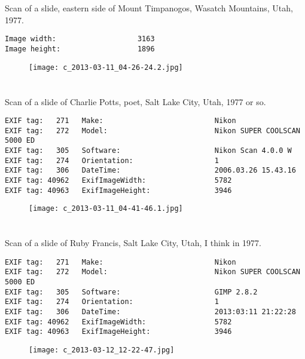 \clearpage
\section{\protect{}}
\noindent Scan of a slide, eastern side of Mount Timpanogos, Wasatch Mountains, Utah, 1977.
\noindent
\begin{lstlisting}
Image width:                   3163
Image height:                  1896

\end{lstlisting}
\clearpage
\begin{figure}
\raggedleft
\texttt{[image: c\_2013-03-11\_04-26-24.2.jpg]}
\end{figure}


\clearpage
\section{\protect{}}
\noindent Scan of a slide of Charlie Potts, poet, Salt Lake City, Utah, 1977 or so.
\noindent
\begin{lstlisting}
EXIF tag:   271   Make:                          Nikon
EXIF tag:   272   Model:                         Nikon SUPER COOLSCAN 5000 ED
EXIF tag:   305   Software:                      Nikon Scan 4.0.0 W
EXIF tag:   274   Orientation:                   1
EXIF tag:   306   DateTime:                      2006.03.26 15.43.16
EXIF tag: 40962   ExifImageWidth:                5782
EXIF tag: 40963   ExifImageHeight:               3946

\end{lstlisting}
\clearpage
\begin{figure}
\raggedleft
\texttt{[image: c\_2013-03-11\_04-41-46.1.jpg]}
\end{figure}


\clearpage
\section{\protect{}}
\noindent Scan of a slide of Ruby Francis, Salt Lake City, Utah, I think in 1977.
\noindent
\begin{lstlisting}
EXIF tag:   271   Make:                          Nikon
EXIF tag:   272   Model:                         Nikon SUPER COOLSCAN 5000 ED
EXIF tag:   305   Software:                      GIMP 2.8.2
EXIF tag:   274   Orientation:                   1
EXIF tag:   306   DateTime:                      2013:03:11 21:22:28
EXIF tag: 40962   ExifImageWidth:                5782
EXIF tag: 40963   ExifImageHeight:               3946

\end{lstlisting}
\clearpage
\begin{figure}
\raggedleft
\texttt{[image: c\_2013-03-12\_12-22-47.jpg]}
\end{figure}


